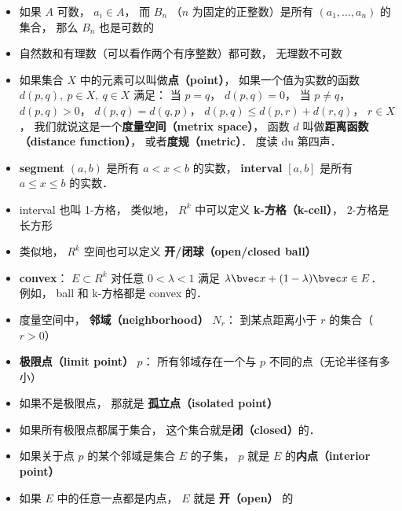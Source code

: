 \begin{itemize}
\item 如果 $A$ 可数， $a_i \in A$，  而 $B_n$ （$n$ 为固定的正整数）是所有 $(a_1, \dots, a_n)$ 的集合， 那么 $B_n$ 也是可数的

\item 自然数和有理数（可以看作两个有序整数）都可数， 无理数不可数

\item 如果集合 $X$ 中的元素可以叫做\textbf{点（point）}， 如果一个值为实数的函数 $d(p, q), \ p \in X,\ q \in X$ 满足： 当 $p = q$， $d(p, q) = 0$， 当 $p \ne q$， $d(p, q) > 0$， $d(p, q) = d(q, p)$， $d(p, q) \leqslant d(p, r) + d(r, q)$， $r \in X$， 我们就说这是一个\textbf{度量空间（metrix space）}， 函数 $d$ 叫做\textbf{距离函数（distance function）}， 或者\textbf{度规（metric）}． 度读 du 第四声．

\item \textbf{segment} $(a, b)$ 是所有 $a < x < b$ 的实数， \textbf{interval} $[a, b]$ 是所有 $a \leqslant x \leqslant b$ 的实数．

\item interval 也叫 1-方格， 类似地， $R^k$ 中可以定义 \textbf{k-方格（k-cell）}， 2-方格是长方形

\item 类似地， $R^k$ 空间也可以定义 \textbf{开/闭球（open/closed ball）}

\item \textbf{convex}： $E \subset R^k$ 对任意 $0 < \lambda < 1$ 满足 $\lambda \bvec x + (1 - \lambda) \bvec x \in E$． 例如， ball 和 k-方格都是 convex 的．

\item 度量空间中， \textbf{邻域（neighborhood）} $N_r$： 到某点距离小于 $r$ 的集合（$r > 0$）

\item \textbf{极限点（limit point）} $p$： 所有邻域存在一个与 $p$ 不同的点（无论半径有多小）

\item 如果不是极限点， 那就是 \textbf{孤立点（isolated point）}

\item 如果所有极限点都属于集合， 这个集合就是\textbf{闭（closed）}的．

\item 如果关于点 $p$ 的某个邻域是集合 $E$ 的子集， $p$ 就是 $E$ 的\textbf{内点（interior point）}

\item 如果 $E$ 中的任意一点都是内点， $E$ 就是 \textbf{开（open）} 的


\end{itemize}

